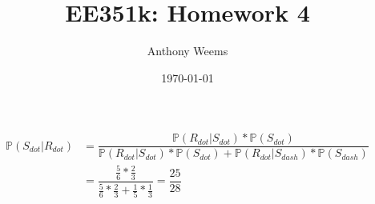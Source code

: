 \documentclass{article}
\begin{document}
\title{EE351k: Homework 4}
\author{Anthony Weems}
\date{\today}
\maketitle

\subsection{}

\begin{align*}
    \mathbb{P}(S_{dot}|R_{dot}) &= \dfrac{\mathbb{P}(R_{dot}|S_{dot}) * \mathbb{P}(S_{dot})}{\mathbb{P}(R_{dot}|S_{dot}) * \mathbb{P}(S_{dot}) + \mathbb{P}(R_{dot}|S_{dash}) * \mathbb{P}(S_{dash})} \\
    &=\dfrac{\frac{5}{6} * \frac{2}{3}}{\frac{5}{6} * \frac{2}{3} + \frac{1}{5} * \frac{1}{3}} =\dfrac{25}{28}
\end{align*}

\subsection{}
\end{document}
